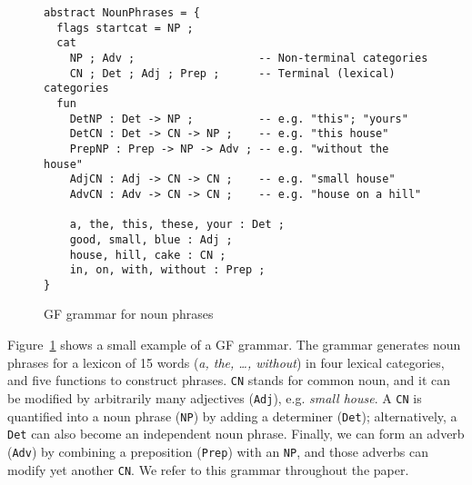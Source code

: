 \documentclass[11pt]{article}
\def\t#1{\texttt{#1}}
\newcommand{\todo}[1]{{\color{cyan}\textbf{[TODO: }#1\textbf{]}}}
\begin{document}







\begin{figure}[h]
  \centering
\begin{verbatim}
abstract NounPhrases = {
  flags startcat = NP ;
  cat
    NP ; Adv ;                   -- Non-terminal categories
    CN ; Det ; Adj ; Prep ;      -- Terminal (lexical) categories
  fun
    DetNP : Det -> NP ;          -- e.g. "this"; "yours"
    DetCN : Det -> CN -> NP ;    -- e.g. "this house"
    PrepNP : Prep -> NP -> Adv ; -- e.g. "without the house"
    AdjCN : Adj -> CN -> CN ;    -- e.g. "small house"
    AdvCN : Adv -> CN -> CN ;    -- e.g. "house on a hill"

    a, the, this, these, your : Det ;
    good, small, blue : Adj ;
    house, hill, cake : CN ;
    in, on, with, without : Prep ; 
}
\end{verbatim}
  \caption{GF grammar for noun phrases}
\label{fig:exampleGrammar}
\end{figure}

Figure~\ref{fig:exampleGrammar} shows a small example of a GF
grammar. The grammar generates noun phrases for a lexicon of 15
words (\emph{a, the, \dots, without}) in four lexical categories,
and five functions to construct phrases.  
\t{CN} stands for common noun, and it can be modified by arbitrarily
many adjectives (\t{Adj}), e.g. \emph{small house}. A \t{CN} is
quantified into a noun phrase (\t{NP}) by adding a determiner
(\t{Det}); alternatively, a \t{Det} can also become
an independent noun phrase. Finally, we can form an
adverb (\t{Adv}) by combining a preposition (\t{Prep}) with an \t{NP}, and those adverbs can modify
yet another \t{CN}. 
We refer to this grammar throughout the paper.
\end{document}

